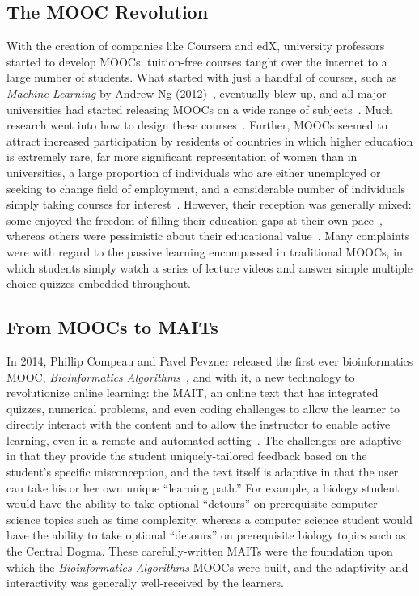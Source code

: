 \subsection{The MOOC Revolution}
With the creation of companies like Coursera and edX, university professors started to develop \glspl{MOOC}: tuition-free courses taught over the internet to a large number of students. What started with just a handful of courses, such as \textit{Machine Learning} by Andrew Ng (2012)~\cite{Ng2012}, eventually blew up, and all major universities had started releasing \glspl{MOOC} on a wide range of subjects~\cite{Pappano2012}. Much research went into how to design these courses~\cite{Guardia2013,Bruff2013,Breslow2013,Guo2014}. Further, \glspl{MOOC} seemed to attract increased participation by residents of countries in which higher education is extremely rare, far more significant representation of women than in universities, a large proportion of individuals who are either unemployed or seeking to change field of employment, and a considerable number of individuals simply taking courses for interest~\cite{Bayeck2016}. However, their reception was generally mixed: some enjoyed the freedom of filling their education gaps at their own pace~\cite{Milligan2017}, whereas others were pessimistic about their educational value~\cite{Vardi2012}. Many complaints were with regard to the passive learning encompassed in traditional \glspl{MOOC}, in which students simply watch a series of lecture videos and answer simple multiple choice quizzes embedded throughout.

\subsection{From MOOCs to MAITs}
In 2014, Phillip Compeau and Pavel Pevzner released the first ever bioinformatics \gls{MOOC}, \textit{Bioinformatics Algorithms}~\cite{Compeau2014}, and with it, a new technology to revolutionize online learning: the \gls{MAIT}, an online text that has integrated quizzes, numerical problems, and even coding challenges to allow the learner to directly interact with the content and to allow the instructor to enable active learning, even in a remote and automated setting~\cite{Compeau2015}. The challenges are adaptive in that they provide the student uniquely-tailored feedback based on the student's specific misconception, and the text itself is adaptive in that the user can take his or her own unique ``learning path.'' For example, a biology student would have the ability to take optional ``detours'' on prerequisite computer science topics such as time complexity, whereas a computer science student would have the ability to take optional ``detours'' on prerequisite biology topics such as the Central Dogma. These carefully-written \glspl{MAIT} were the foundation upon which the \textit{Bioinformatics Algorithms} \glspl{MOOC} were built, and the adaptivity and interactivity was generally well-received by the learners.

